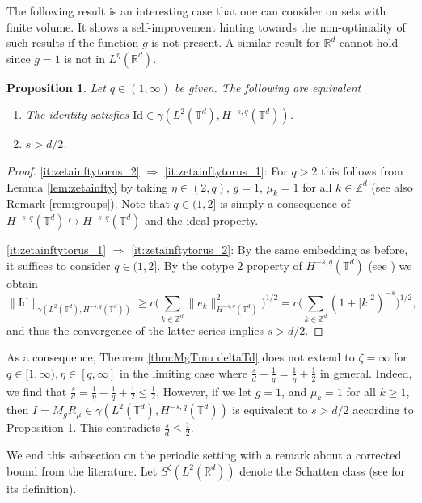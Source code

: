 \documentclass[reqno]{amsart}
\theoremstyle{plain}
\theoremstyle{remark}
\theoremstyle{plain}
\newtheorem{proposition}[theorem]{Proposition}
\numberwithin{equation}{section}
\def\Z{{\mathbb Z}}
\def\R{{\mathbb R}}
\newcommand{\T}{\mathbb{T}}
\newcommand{\wt}{\widetilde}
\newcommand{\1}{\one}
\begin{document}
The following result is an interesting case that one can consider on sets with finite volume. It shows a self-improvement hinting towards the non-optimality of such results if the function $g$ is not present. A similar result for $\R^d$ cannot hold since $g=1$ is not in $L^{\eta}(\R^d)$. 
\begin{proposition}\label{prop:zetainftytorus}
Let $q\in (1, \infty)$ be given. The following are equivalent 
\begin{enumerate}[\rm (1)]
\item\label{it:zetainftytorus_1} The identity satisfies $\mathrm{Id}\in \gamma(L^2(\T^d), H^{-s,q}(\T^d))$.
\item\label{it:zetainftytorus_2} $s>d/2$. 
\end{enumerate}
\end{proposition}
\begin{proof}
\eqref{it:zetainftytorus_2} $\Rightarrow$ \eqref{it:zetainftytorus_1}: For $q>2$ this follows from Lemma \ref{lem:zetainfty} by taking $\eta\in (2, q)$, $g=1$, $\mu_k = 1$ for all $k\in \Z^d$ (see also Remark \ref{rem:groups}). Note that $\wt{q}\in (1, 2]$ is simply a consequence of $H^{-s,q}(\T^d) \hookrightarrow H^{-s,\wt{q}}(\T^d)$ and the ideal property. 

\eqref{it:zetainftytorus_1} $\Rightarrow$ \eqref{it:zetainftytorus_2}: 
By the same embedding as before, it suffices to consider $q\in (1, 2]$. By the cotype $2$ property of $H^{-s,q}(\T^d)$ (see \cite[Corollary 7.1.5]{HNVW2}) we obtain
\[\|\mathrm{Id}\|_{\gamma(L^2(\T^d), H^{-s,q}(\T^d))}\geq c \Big(\sum_{k\in \Z^d}\|e_k\|_{H^{-s,q}(\T^d)}^2\Big)^{1/2} =  c \Big(\sum_{k\in \Z^d} (1+|k|^2)^{-s}\Big)^{1/2},\]
and thus the convergence of the latter series implies $s>d/2$.
\end{proof}

As a consequence, Theorem \ref{thm:MgTmu deltaTd} does not extend to $\zeta=\infty$ for $q\in [1, \infty), \eta\in [q,\infty]$ in the limiting case where $\frac{s}{d} +\frac1q = \frac{1}{\eta}+\frac12$ in general. Indeed, we find that $\frac{s}{d} = \frac{1}{\eta} - \frac1q +\frac12\leq \frac{1}{2}$. However, if we let $g = 1$, and $\mu_k = 1$ for all $k\geq 1$, then $I = M_g R_{\mu} \in \gamma(L^2(\T^d), H^{-s,q}(\T^d))$ is equivalent to $s>d/2$ according to Proposition \ref{prop:zetainftytorus}. This contradicts $\frac{s}{d}\leq \frac12$.


We end this subsection on the periodic setting with a remark about a corrected bound from the literature. Let $S^\zeta(L^2(\R^d))$ denote the Schatten class (see \cite[Appendix D]{HNVW1} for its definition). 
\end{document}
